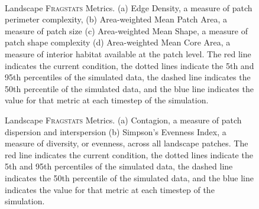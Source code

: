 
\begin{figure}[!htbp]
  \centering
   \\
\caption{Landscape \textsc{Fragstats} Metrics. (a) Edge Density, a measure of patch perimeter complexity, (b) Area-weighted Mean Patch Area, a measure of patch size (c) Area-weighted Mean Shape, a measure of patch shape complexity (d) Area-weighted Mean Core Area, a measure of interior habitat available at the patch level. The red line indicates the current condition, the dotted lines indicate the 5th and 95th percentiles of the simulated data, the dashed line indicates the 50th percentile of the simulated data, and the blue line indicates the value for that metric at each timestep of the simulation.}
\label{fig:fragland1}
\end{figure}

\begin{figure}[!htbp]
  \centering
\caption{Landscape \textsc{Fragstats} Metrics. (a) Contagion, a measure of patch dispersion and interspersion (b) Simpson's Evenness Index, a measure of diversity, or evenness, across all landscape patches. The red line indicates the current condition, the dotted lines indicate the 5th and 95th percentiles of the simulated data, the dashed line indicates the 50th percentile of the simulated data, and the blue line indicates the value for that metric at each timestep of the simulation.}
\label{fig:fragland2}
\end{figure}


